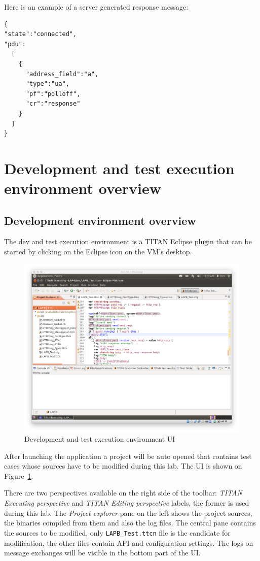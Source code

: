 \documentclass[a4paper]{article}
\begin{document}
Here is an example of a server generated response message:
\begin{verbatim}
{
"state":"connected",
"pdu":
  [
    {
      "address_field":"a",
      "type":"ua",
      "pf":"polloff",
      "cr":"response"
    }
  ]
}
\end{verbatim}

\section{Development and test execution environment overview}

\subsection{Development environment overview}

The dev and test execution environment is a TITAN Eclipse plugin that can be started by clicking on the Eclipse icon on the VM's desktop.

\begin{figure}[H]
  \centering
  \includegraphics[width=\textwidth]{figures/eclipse.png}
  \caption{Development and test execution environment UI}
  \label{fig:eclipse}
\end{figure}

After launching the application a project will be auto opened that contains test cases whose sources have to be modified during this lab. The UI is shown on Figure~\ref{fig:eclipse}.

There are two perspectives available on the right side of the toolbar:
\textit{TITAN Executing perspective} and \textit{TITAN Editing perspective} labels, the former is used during this lab. The \textit{Project explorer} pane on the left shows the project sources, the binaries compiled from them and also the log files. The central pane contains the sources to be modified, only \verb!LAPB_Test.ttcn! file is the candidate for modification, the other files contain API and configuration settings.
The logs on message exchanges will be visible in the bottom part of the UI. 
\end{document}
